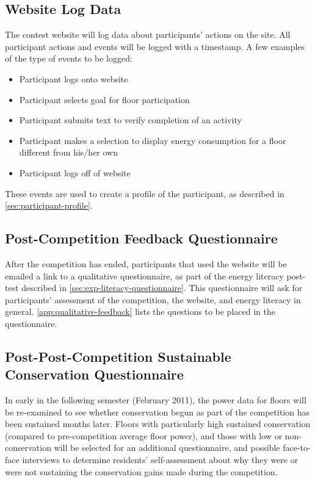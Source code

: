\subsection{Website Log Data}

The contest website will log data about participants' actions on the site. All participant actions and events will be logged with a timestamp. A few examples of the type of events to be logged:

\begin{itemize}
\item Participant logs onto website
\item Participant selects goal for floor participation
\item Participant submits text to verify completion of an activity
\item Participant makes a selection to display energy consumption for a floor different from his/her own
\item Participant logs off of website
\end{itemize}

These events are used to create a profile of the participant, as described in \autoref{sec:participant-profile}.

\subsection{Post-Competition Feedback Questionnaire}
\label{sec:post-competition-feedback}
After the competition has ended, participants that used the website will be emailed a link to a qualitative questionnaire, as part of the energy literacy post-test described in \autoref{sec:exp-literacy-questionnaire}. This questionnaire will ask for participants' assessment of the competition, the website, and energy literacy in general. \autoref{app:qualitative-feedback} lists the questions to be placed in the questionnaire.

\subsection{Post-Post-Competition Sustainable Conservation Questionnaire}

In early in the following semester (February 2011), the power data for floors will be re-examined to see whether conservation begun as part of the competition has been sustained months later. Floors with particularly high sustained conservation (compared to pre-competition average floor power), and those with low or non-conservation will be selected for an additional questionnaire, and possible face-to-face interviews to determine residents' self-assessment about why they were or were not sustaining the conservation gains made during the competition.

